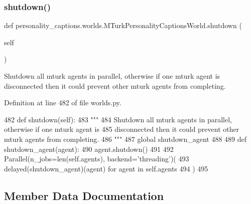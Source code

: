 \subsubsection{\texorpdfstring{shutdown()}{shutdown()}}
{\footnotesize\ttfamily def personality\+\_\+captions.\+worlds.\+M\+Turk\+Personality\+Captions\+World.\+shutdown (\begin{DoxyParamCaption}\item[{}]{self }\end{DoxyParamCaption})}

\begin{DoxyVerb}Shutdown all mturk agents in parallel, otherwise if one mturk agent is
disconnected then it could prevent other mturk agents from completing.
\end{DoxyVerb}
 

Definition at line 482 of file worlds.\+py.


\begin{DoxyCode}
482     \textcolor{keyword}{def }shutdown(self):
483         \textcolor{stringliteral}{"""}
484 \textcolor{stringliteral}{        Shutdown all mturk agents in parallel, otherwise if one mturk agent is}
485 \textcolor{stringliteral}{        disconnected then it could prevent other mturk agents from completing.}
486 \textcolor{stringliteral}{        """}
487         \textcolor{keyword}{global} shutdown\_agent
488 
489         \textcolor{keyword}{def }shutdown\_agent(agent):
490             agent.shutdown()
491 
492         Parallel(n\_jobs=len(self.agents), backend=\textcolor{stringliteral}{'threading'})(
493             delayed(shutdown\_agent)(agent) \textcolor{keywordflow}{for} agent \textcolor{keywordflow}{in} self.agents
494         )
495 \end{DoxyCode}


\subsection{Member Data Documentation}
\mbox{\label{classpersonality__captions_1_1worlds_1_1MTurkPersonalityCaptionsWorld_a3626a4fc2845b1a6942c9bd825aca0e2}} 
